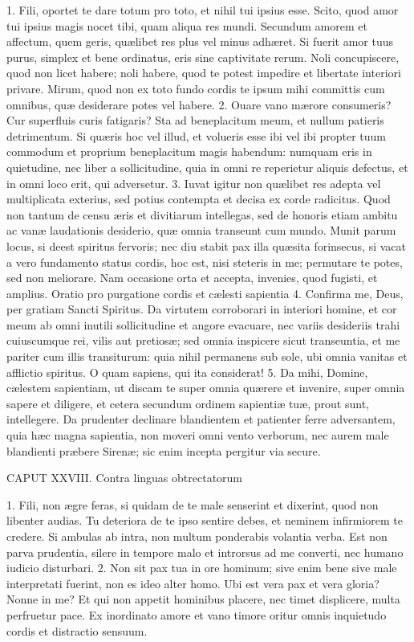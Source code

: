 1. Fili, oportet te dare totum pro toto, et nihil tui ipsius esse. Scito, quod amor tui ipsius magis nocet tibi, quam aliqua res mundi. Secundum amorem et affectum, quem geris, quælibet res plus vel minus adhæret. Si fuerit amor tuus purus, simplex et bene ordinatus, eris sine captivitate rerum. Noli concupiscere, quod non licet habere; noli habere, quod te potest impedire et libertate interiori privare. Mirum, quod non ex toto fundo cordis te ipsum mihi committis cum omnibus, quæ desiderare potes vel habere.
2. Ouare vano mærore consumeris? Cur superfluis curis fatigaris? Sta ad beneplacitum meum, et nullum patieris detrimentum. Si quæris hoc vel illud, et volueris esse ibi vel ibi propter tuum commodum et proprium beneplacitum magis habendum: numquam eris in quietudine, nec liber a sollicitudine, quia in omni re reperietur aliquis defectus, et in omni loco erit, qui adversetur.
3. Iuvat igitur non quælibet res adepta vel multiplicata exterius, sed potius contempta et decisa ex corde radicitus. Quod non tantum de censu æris et divitiarum intellegas, sed de honoris etiam ambitu ac vanæ laudationis desiderio, quæ omnia transeunt cum mundo. Munit parum locus, si deest spiritus fervoris; nec diu stabit pax illa quæsita forinsecus, si vacat a vero fundamento status cordis, hoc est, nisi steteris in me; permutare te potes, sed non meliorare. Nam occasione orta et accepta, invenies, quod fugisti, et amplius.
Oratio pro purgatione cordis et cælesti sapientia
4. Confirma me, Deus, per gratiam Sancti Spiritus. Da virtutem corroborari in interiori homine, et cor meum ab omni inutili sollicitudine et angore evacuare, nec variis desideriis trahi cuiuscumque rei, vilis aut pretiosæ; sed omnia inspicere sicut transeuntia, et me pariter cum illis transiturum: quia nihil permanens sub sole, ubi omnia vanitas et afflictio spiritus. O quam sapiens, qui ita considerat!
5. Da mihi, Domine, cælestem sapientiam, ut discam te super omnia quærere et invenire, super omnia sapere et diligere, et cetera secundum ordinem sapientiæ tuæ, prout sunt, intellegere. Da prudenter declinare blandientem et patienter ferre adversantem, quia hæc magna sapientia, non moveri omni vento verborum, nec aurem male blandienti præbere Sirenæ; sic enim incepta pergitur via secure.


CAPUT XXVIII.
Contra linguas obtrectatorum

1. Fili, non ægre feras, si quidam de te male senserint et dixerint, quod non libenter audias. Tu deteriora de te ipso sentire debes, et neminem infirmiorem te credere. Si ambulas ab intra, non multum ponderabis volantia verba. Est non parva prudentia, silere in tempore malo et introrsus ad me converti, nec humano iudicio disturbari.
2. Non sit pax tua in ore hominum; sive enim bene sive male interpretati fuerint, non es ideo alter homo. Ubi est vera pax et vera gloria? Nonne in me? Et qui non appetit hominibus placere, nec timet displicere, multa perfruetur pace. Ex inordinato amore et vano timore oritur omnis inquietudo cordis et distractio sensuum.


